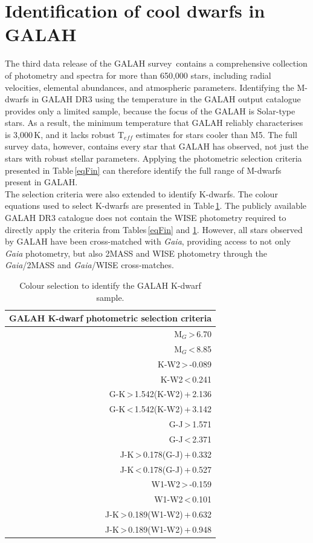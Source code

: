 \section{Identification of cool dwarfs in GALAH}
\label{secGALAHdwarfs}
The third data release of the GALAH survey\,\citep{2021Buder} contains a comprehensive collection of photometry and spectra for more than 650,000 stars, including radial velocities, elemental abundances, and atmospheric parameters. Identifying the M-dwarfs in GALAH DR3 using the temperature in the GALAH output catalogue provides only a limited sample, because the focus of the GALAH is Solar-type stars. As a result, the minimum temperature that GALAH reliably characterises is 3,000\,K, and it lacks robust T$_{eff}$ estimates for stars cooler than M5. The full survey data, however, contains every star that GALAH has observed, not just the stars with robust stellar parameters. Applying the photometric selection criteria presented in Table\,\ref{eqFin} can therefore identify the full range of M-dwarfs present in GALAH.\\

The selection criteria were also extended to identify K-dwarfs. The colour equations used to select K-dwarfs are presented in Table\,\ref{eqKD}. The publicly available GALAH DR3 catalogue does not contain the WISE photometry required to directly apply the criteria from Tables\,\ref{eqFin} and \ref{eqKD}. However, all stars observed by GALAH have been cross-matched with {\em Gaia}, providing access to not only {\em Gaia} photometry, but also 2MASS and WISE photometry through the {\em Gaia}/2MASS and {\em Gaia}/WISE cross-matches.\\

\begin{table}[]
    \centering
    \begin{tabular}{|r|}
        \hline
        GALAH K-dwarf photometric selection criteria\\
        \hline
		M$_G$\,\textgreater\,6.70\\
		M$_G$\,\textless\,8.85\\
        K-W2\,\textgreater\,-0.089\\
        K-W2\,\textless\,0.241\\
        G-K\,\textgreater\,1.542(K-W2)\,+\,2.136\\
        G-K\,\textless\,1.542(K-W2)\,+\,3.142\\
    	G-J\,\textgreater\,1.571\\
    	G-J\,\textless\,2.371\\
    	J-K\,\textgreater\,0.178(G-J)\,+\,0.332\\
    	J-K\,\textless\,0.178(G-J)\,+\,0.527\\
		W1-W2\,\textgreater\,-0.159\\
    	W1-W2\,\textless\,0.101\\
    	J-K\,\textgreater\,0.189(W1-W2)\,+\,0.632\\
    	J-K\,\textgreater\,0.189(W1-W2)\,+\,0.948\\
        \hline
    \end{tabular}
    \caption{Colour selection to identify the GALAH K-dwarf sample.}
    \label{eqKD}
\end{table}

